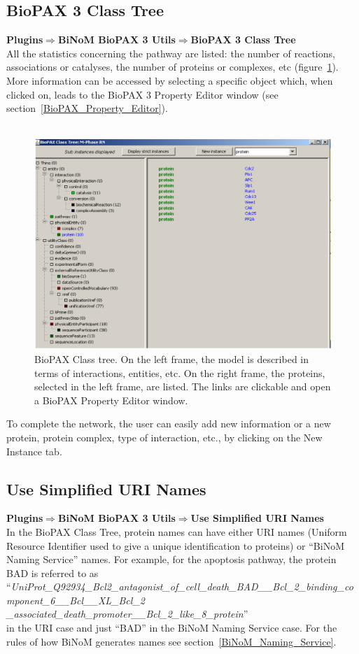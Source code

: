 \subsection{BioPAX 3 Class Tree}
\textbf{Plugins$\Rightarrow$BiNoM BioPAX 3 Utils$\Rightarrow$BioPAX 3 Class Tree}\\
All the statistics concerning the pathway are listed: the number of reactions, associations or catalyses, the number of proteins or complexes, etc (figure~\ref{BioPAX_Class_Tree}). More information can be accessed by selecting a specific object which, when clicked on, leads to the BioPAX 3 Property Editor window (see section~\ref{BioPAX_Property_Editor}).\\\\
\begin{figure}[h]
\centering
\includegraphics[width=18 cm]{graphics/BioPAX_Class_Tree}
\caption{BioPAX Class tree. On the left frame, the model is described in terms of interactions, entities, etc. On the right frame, the proteins, selected in the left frame, are listed. The links are clickable and open a BioPAX Property Editor window.}
\label{BioPAX_Class_Tree}
\end{figure}
To complete the network, the user can easily add new information or a new protein, protein complex, type of interaction, etc., by clicking on the New Instance tab.

\subsection{Use Simplified URI Names}
\textbf{Plugins$\Rightarrow$BiNoM BioPAX 3 Utils$\Rightarrow$Use Simplified URI Names}\\
In the BioPAX Class Tree, protein names can have either URI names (Uniform Resource Identifier used to give a unique identification to proteins) or “BiNoM Naming Service” names. For example, for the apoptosis pathway, the protein BAD is referred to as\\
“\textit{UniProt\_Q92934\_Bcl2\_antagonist\_of\_cell\_death\_BAD\_\_Bcl\_2\_binding\_component\_6\_\_Bcl\_\_XL\_Bcl\_2\\
\_associated\_death\_promoter\_\_Bcl\_2\_like\_8\_protein}”\\
in the URI case and just “BAD” in the BiNoM Naming Service case. For the rules of how BiNoM generates names see section~\ref{BiNoM_Naming_Service}.

